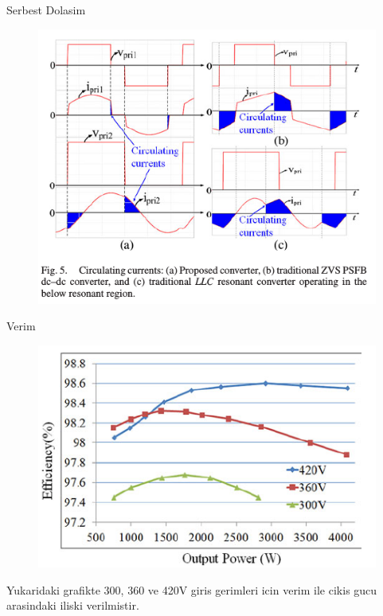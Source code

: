 \documentclass[10pt]{beamer}
\begin{document}
\begin{frame}{Serbest Dolasim}
	\begin{figure}
		\centering
		\includegraphics[scale=0.50]{circulating_currents.png}
	\end{figure}
\end{frame}

\begin{frame}{Verim}
	\begin{figure}
		\centering
		\includegraphics[scale=0.50]{efficiency.png}
	\end{figure}
	Yukaridaki grafikte 300, 360 ve 420V giris gerimleri icin verim ile cikis gucu arasindaki iliski verilmistir.
\end{frame}
\end{document}
